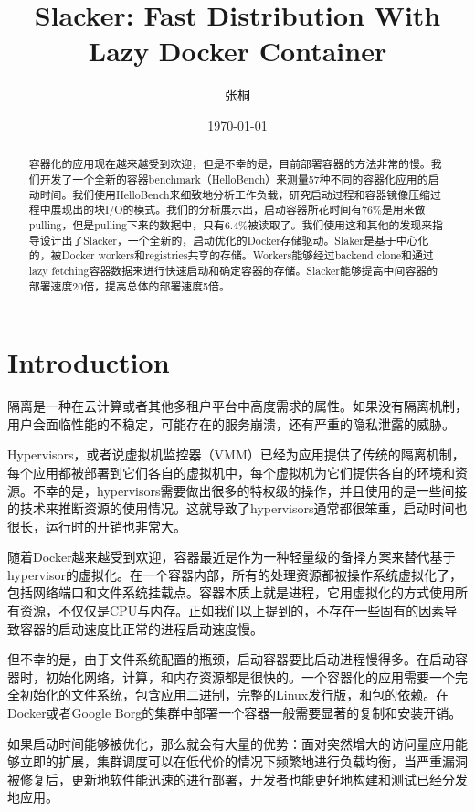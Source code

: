 \documentclass[UTF8]{ctexart}
\title{Slacker: Fast Distribution With Lazy Docker Container}
\author{张桐}
\date{\today}
\begin{document}
\maketitle

\begin{abstract}
容器化的应用现在越来越受到欢迎，但是不幸的是，目前部署容器的方法非常的慢。我们开发了一个全新的容器benchmark（HelloBench）来测量57种不同的容器化应用的启动时间。我们使用HelloBench来细致地分析工作负载，研究启动过程和容器镜像压缩过程中展现出的块I/O的模式。我们的分析展示出，启动容器所花时间有76\%是用来做pulling，但是pulling下来的数据中，只有6.4\%被读取了。我们使用这和其他的发现来指导设计出了Slacker，一个全新的，启动优化的Docker存储驱动。Slaker是基于中心化的，被Docker workers和registries共享的存储。Workers能够经过backend clone和通过lazy fetching容器数据来进行快速启动和确定容器的存储。Slacker能够提高中间容器的部署速度20倍，提高总体的部署速度5倍。
\end{abstract}
\section{Introduction}
隔离是一种在云计算或者其他多租户平台中高度需求的属性。如果没有隔离机制，用户会面临性能的不稳定，可能存在的服务崩溃，还有严重的隐私泄露的威胁。

Hypervisors，或者说虚拟机监控器（VMM）已经为应用提供了传统的隔离机制，每个应用都被部署到它们各自的虚拟机中，每个虚拟机为它们提供各自的环境和资源。不幸的是，hypervisors需要做出很多的特权级的操作，并且使用的是一些间接的技术来推断资源的使用情况。这就导致了hypervisors通常都很笨重，启动时间也很长，运行时的开销也非常大。

随着Docker越来越受到欢迎，容器最近是作为一种轻量级的备择方案来替代基于hypervisor的虚拟化。在一个容器内部，所有的处理资源都被操作系统虚拟化了，包括网络端口和文件系统挂载点。容器本质上就是进程，它用虚拟化的方式使用所有资源，不仅仅是CPU与内存。正如我们以上提到的，不存在一些固有的因素导致容器的启动速度比正常的进程启动速度慢。

但不幸的是，由于文件系统配置的瓶颈，启动容器要比启动进程慢得多。在启动容器时，初始化网络，计算，和内存资源都是很快的。一个容器化的应用需要一个完全初始化的文件系统，包含应用二进制，完整的Linux发行版，和包的依赖。在Docker或者Google Borg的集群中部署一个容器一般需要显著的复制和安装开销。

如果启动时间能够被优化，那么就会有大量的优势：面对突然增大的访问量应用能够立即的扩展，集群调度可以在低代价的情况下频繁地进行负载均衡，当严重漏洞被修复后，更新地软件能迅速的进行部署，开发者也能更好地构建和测试已经分发地应用。
\end{document}
